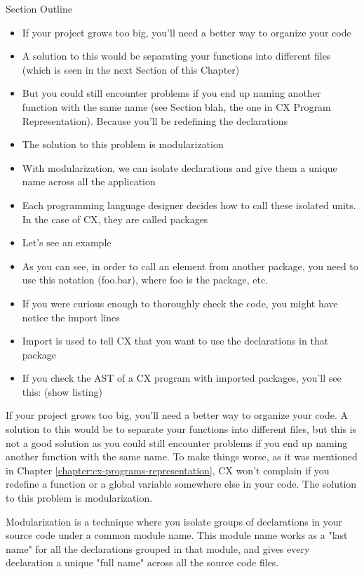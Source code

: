 \documentclass[11pt,fleqn,openany]{book} %
\begin{document}
\begin{remark}
Section Outline
    \begin{itemize}
    	\item If your project grows too big, you'll need a better way to organize your code
        \item A solution to this would be separating your functions into different files (which is seen in the next Section of this Chapter)
        \item But you could still encounter problems if you end up naming another function with the same name (see Section blah, the one in CX Program Representation). Because you'll be redefining the declarations
        \item The solution to this problem is modularization
        \item With modularization, we can isolate declarations and give them a unique name across all the application
        \item Each programming language designer decides how to call these isolated units. In the case of CX, they are called packages
        \item Let's see an example
        \item As you can see, in order to call an element from another package, you need to use this notation (foo.bar), where foo is the package, etc.
        \item If you were curious enough to thoroughly check the code, you might have notice the import lines
        \item Import is used to tell CX that you want to use the declarations in that package
        \item If you check the AST of a CX program with imported packages, you'll see this: (show listing)
    \end{itemize}
\end{remark}

If your project grows too big, you'll need a better way to organize your code. A solution to this would be to separate your functions into different files, but this is not a good solution as you could still encounter problems if you end up naming another function with the same name. To make things worse, as it was mentioned in Chapter \ref{chapter:cx-programs-representation}, CX won't complain if you redefine a function or a global variable somewhere else in your code. The solution to this problem is modularization.

Modularization is a technique where you isolate groups of declarations in your source code under a common module name. This module name works as a "last name" for all the declarations grouped in that module, and gives every declaration a unique "full name" across all the source code files.
\end{document}

